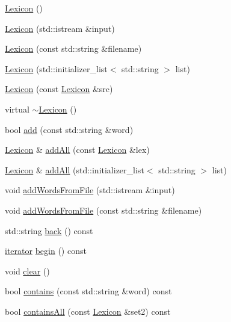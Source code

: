 \begin{DoxyCompactItemize}
\item 
\mbox{\hyperlink{classLexicon_ac38cafae91a89528e71f257cbad724fd}{Lexicon}} ()
\item 
\mbox{\hyperlink{classLexicon_a6e60e4bcfef0337c5133d3bedcccd06f}{Lexicon}} (std\+::istream \&input)
\item 
\mbox{\hyperlink{classLexicon_a64a064a38897e1e4ce9b755a238723f4}{Lexicon}} (const std\+::string \&filename)
\item 
\mbox{\hyperlink{classLexicon_a0acc6dfba69bc35cba25ee02ac91c4e5}{Lexicon}} (std\+::initializer\+\_\+list$<$ std\+::string $>$ list)
\item 
\mbox{\hyperlink{classLexicon_acd310b995d41180f2f29bd68bec7d290}{Lexicon}} (const \mbox{\hyperlink{classLexicon}{Lexicon}} \&src)
\item 
virtual \mbox{\hyperlink{classLexicon_a9d71fdc56ec42614e240463e6724969e}{$\sim$\+Lexicon}} ()
\item 
bool \mbox{\hyperlink{classLexicon_ae678e727fb107637268e8f00cd759889}{add}} (const std\+::string \&word)
\item 
\mbox{\hyperlink{classLexicon}{Lexicon}} \& \mbox{\hyperlink{classLexicon_a9d62d8dcb351ae40c8a2220a9871348b}{add\+All}} (const \mbox{\hyperlink{classLexicon}{Lexicon}} \&lex)
\item 
\mbox{\hyperlink{classLexicon}{Lexicon}} \& \mbox{\hyperlink{classLexicon_a554e59039648403990042d16710855e0}{add\+All}} (std\+::initializer\+\_\+list$<$ std\+::string $>$ list)
\item 
void \mbox{\hyperlink{classLexicon_a215fcead487aace2e89b04863e326ba6}{add\+Words\+From\+File}} (std\+::istream \&input)
\item 
void \mbox{\hyperlink{classLexicon_a3891deaa85aee9a52b6ca258d1514716}{add\+Words\+From\+File}} (const std\+::string \&filename)
\item 
std\+::string \mbox{\hyperlink{classLexicon_a324ff6b85a0d392036efefc95b5d5e83}{back}} () const
\item 
\mbox{\hyperlink{classLexicon_1_1iterator}{iterator}} \mbox{\hyperlink{classLexicon_a0c62c15c8ed609e7e5e9518cf5f5c712}{begin}} () const
\item 
void \mbox{\hyperlink{classLexicon_ac8bb3912a3ce86b15842e79d0b421204}{clear}} ()
\item 
bool \mbox{\hyperlink{classLexicon_a479b1bac4a3c243907c80e5c6f9b05d5}{contains}} (const std\+::string \&word) const
\item 
bool \mbox{\hyperlink{classLexicon_a9cc56f4fc1106ca74a59fceb9d68b3e9}{contains\+All}} (const \mbox{\hyperlink{classLexicon}{Lexicon}} \&set2) const

\end{DoxyCompactItemize}
